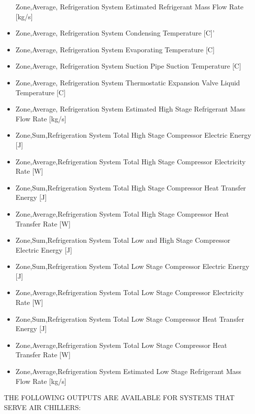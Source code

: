 \begin{itemize}
  Zone,Average, Refrigeration System Estimated Refrigerant Mass Flow Rate {[}kg/s{]}
\item
  Zone,Average, Refrigeration System Condensing Temperature {[}C{]}'
\item
  Zone,Average, Refrigeration System Evaporating Temperature {[}C{]}
\item
  Zone,Average, Refrigeration System Suction Pipe Suction Temperature {[}C{]}
\item
  Zone,Average, Refrigeration System Thermostatic Expansion Valve Liquid Temperature {[}C{]}
\item
  Zone,Average, Refrigeration System Estimated High Stage Refrigerant Mass Flow Rate {[}kg/s{]}
\item
  Zone,Sum,Refrigeration System Total High Stage Compressor Electric Energy {[}J{]}
\item
  Zone,Average,Refrigeration System Total High Stage Compressor Electricity Rate {[}W{]}
\item
  Zone,Sum,Refrigeration System Total High Stage Compressor Heat Transfer Energy {[}J{]}
\item
  Zone,Average,Refrigeration System Total High Stage Compressor Heat Transfer Rate {[}W{]}
\item
  Zone,Sum,Refrigeration System Total Low and High Stage Compressor Electric Energy {[}J{]}
\item
  Zone,Sum,Refrigeration System Total Low Stage Compressor Electric Energy {[}J{]}
\item
  Zone,Average,Refrigeration System Total Low Stage Compressor Electricity Rate {[}W{]}
\item
  Zone,Sum,Refrigeration System Total Low Stage Compressor Heat Transfer Energy {[}J{]}
\item
  Zone,Average,Refrigeration System Total Low Stage Compressor Heat Transfer Rate {[}W{]}
\item
  Zone,Average,Refrigeration System Estimated Low Stage Refrigerant Mass Flow Rate {[}kg/s{]}
\end{itemize}

THE FOLLOWING OUTPUTS ARE AVAILABLE FOR SYSTEMS THAT SERVE AIR CHILLERS:

